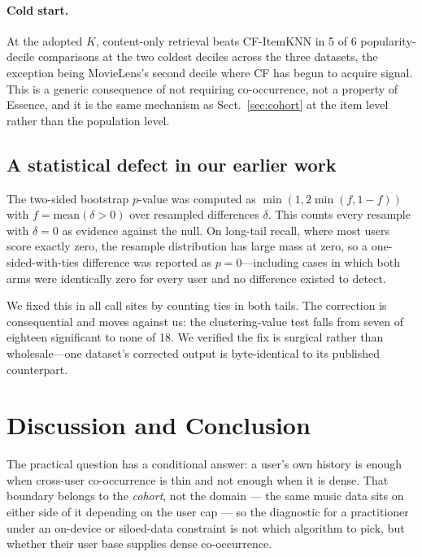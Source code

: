 \documentclass[runningheads]{llncs}
\begin{document}
\paragraph{Cold start.}\label{sec:cold} At the adopted $K$, content-only retrieval beats CF-ItemKNN in 5 of
6 popularity-decile comparisons at the two coldest deciles across the three datasets, the
exception being MovieLens's second decile where CF has begun to acquire signal. This is a
generic consequence of not requiring co-occurrence, not a property of Essence, and it is the
same mechanism as Sect.~\ref{sec:cohort} at the item level rather than the population level.

\subsection{A statistical defect in our earlier work}\label{sec:bug}

The two-sided bootstrap $p$-value was computed as $\min(1, 2\min(f, 1-f))$ with
$f = \mathrm{mean}(\delta > 0)$ over resampled differences $\delta$. This counts every
resample with $\delta = 0$ as evidence against the null. On long-tail recall, where most
users score exactly zero, the resample distribution has large mass at zero, so a
one-sided-with-ties difference was reported as $p = 0$---including cases in which both arms
were identically zero for every user and no difference existed to detect.

We fixed this in all call sites by counting ties in both tails. The correction is
consequential and moves against us: the clustering-value test falls from seven of eighteen
significant to none of 18. We verified the fix is surgical rather than
wholesale---one dataset's corrected output is byte-identical to its published counterpart.

\section{Discussion and Conclusion}

The practical question has a conditional answer: a user's own history is enough when
cross-user co-occurrence is thin and not enough when it is dense. That boundary belongs to
the \emph{cohort}, not the domain --- the same music data sits on either side of it
depending on the user cap --- so the diagnostic for a practitioner under an on-device or
siloed-data constraint is not which algorithm to pick, but whether their user base supplies
dense co-occurrence.
\end{document}
